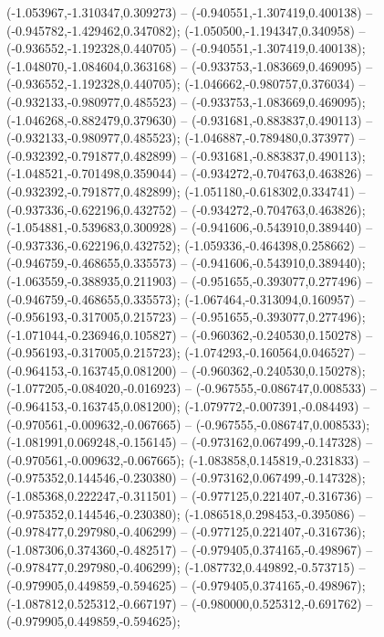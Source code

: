  (-1.053967,-1.310347,0.309273) -- (-0.940551,-1.307419,0.400138) -- (-0.945782,-1.429462,0.347082);
 (-1.050500,-1.194347,0.340958) -- (-0.936552,-1.192328,0.440705) -- (-0.940551,-1.307419,0.400138);
 (-1.048070,-1.084604,0.363168) -- (-0.933753,-1.083669,0.469095) -- (-0.936552,-1.192328,0.440705);
 (-1.046662,-0.980757,0.376034) -- (-0.932133,-0.980977,0.485523) -- (-0.933753,-1.083669,0.469095);
 (-1.046268,-0.882479,0.379630) -- (-0.931681,-0.883837,0.490113) -- (-0.932133,-0.980977,0.485523);
 (-1.046887,-0.789480,0.373977) -- (-0.932392,-0.791877,0.482899) -- (-0.931681,-0.883837,0.490113);
 (-1.048521,-0.701498,0.359044) -- (-0.934272,-0.704763,0.463826) -- (-0.932392,-0.791877,0.482899);
 (-1.051180,-0.618302,0.334741) -- (-0.937336,-0.622196,0.432752) -- (-0.934272,-0.704763,0.463826);
 (-1.054881,-0.539683,0.300928) -- (-0.941606,-0.543910,0.389440) -- (-0.937336,-0.622196,0.432752);
 (-1.059336,-0.464398,0.258662) -- (-0.946759,-0.468655,0.335573) -- (-0.941606,-0.543910,0.389440);
 (-1.063559,-0.388935,0.211903) -- (-0.951655,-0.393077,0.277496) -- (-0.946759,-0.468655,0.335573);
 (-1.067464,-0.313094,0.160957) -- (-0.956193,-0.317005,0.215723) -- (-0.951655,-0.393077,0.277496);
 (-1.071044,-0.236946,0.105827) -- (-0.960362,-0.240530,0.150278) -- (-0.956193,-0.317005,0.215723);
 (-1.074293,-0.160564,0.046527) -- (-0.964153,-0.163745,0.081200) -- (-0.960362,-0.240530,0.150278);
 (-1.077205,-0.084020,-0.016923) -- (-0.967555,-0.086747,0.008533) -- (-0.964153,-0.163745,0.081200);
 (-1.079772,-0.007391,-0.084493) -- (-0.970561,-0.009632,-0.067665) -- (-0.967555,-0.086747,0.008533);
 (-1.081991,0.069248,-0.156145) -- (-0.973162,0.067499,-0.147328) -- (-0.970561,-0.009632,-0.067665);
 (-1.083858,0.145819,-0.231833) -- (-0.975352,0.144546,-0.230380) -- (-0.973162,0.067499,-0.147328);
 (-1.085368,0.222247,-0.311501) -- (-0.977125,0.221407,-0.316736) -- (-0.975352,0.144546,-0.230380);
 (-1.086518,0.298453,-0.395086) -- (-0.978477,0.297980,-0.406299) -- (-0.977125,0.221407,-0.316736);
 (-1.087306,0.374360,-0.482517) -- (-0.979405,0.374165,-0.498967) -- (-0.978477,0.297980,-0.406299);
 (-1.087732,0.449892,-0.573715) -- (-0.979905,0.449859,-0.594625) -- (-0.979405,0.374165,-0.498967);
 (-1.087812,0.525312,-0.667197) -- (-0.980000,0.525312,-0.691762) -- (-0.979905,0.449859,-0.594625);
